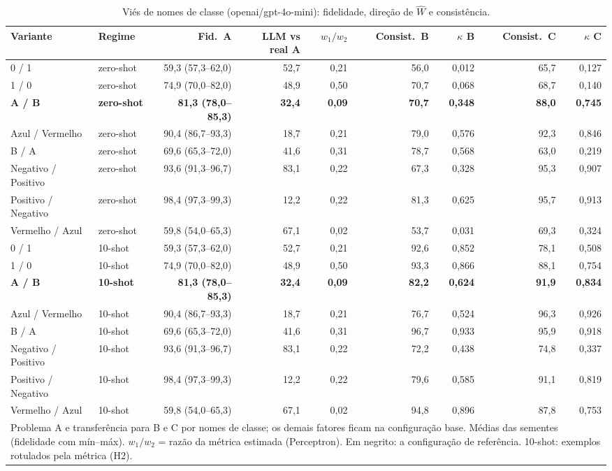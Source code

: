 \begin{table}[htbp]
\centering
\small
\caption{Viés de nomes de classe (openai/gpt-4o-mini): fidelidade, direção de $\hat{W}$ e consistência.}
\label{tab:bloco1_vies_nomes_classe_gpt4mini}
\begin{tabular}{llrrrrrrr}
\toprule
Variante & Regime & Fid.\ A & LLM vs real A & $w_1/w_2$ & Consist.\ B & $\kappa$ B & Consist.\ C & $\kappa$ C \\
\midrule
0 / 1 & zero-shot & 59,3 (57,3–62,0) & 52,7 & 0,21 & 56,0 & 0,012 & 65,7 & 0,127 \\
1 / 0 & zero-shot & 74,9 (70,0–82,0) & 48,9 & 0,50 & 70,7 & 0,068 & 68,7 & 0,140 \\
\textbf{A / B} & \textbf{zero-shot} & \textbf{81,3 (78,0–85,3)} & \textbf{32,4} & \textbf{0,09} & \textbf{70,7} & \textbf{0,348} & \textbf{88,0} & \textbf{0,745} \\
Azul / Vermelho & zero-shot & 90,4 (86,7–93,3) & 18,7 & 0,21 & 79,0 & 0,576 & 92,3 & 0,846 \\
B / A & zero-shot & 69,6 (65,3–72,0) & 41,6 & 0,31 & 78,7 & 0,568 & 63,0 & 0,219 \\
Negativo / Positivo & zero-shot & 93,6 (91,3–96,7) & 83,1 & 0,22 & 67,3 & 0,328 & 95,3 & 0,907 \\
Positivo / Negativo & zero-shot & 98,4 (97,3–99,3) & 12,2 & 0,22 & 81,3 & 0,625 & 95,7 & 0,913 \\
Vermelho / Azul & zero-shot & 59,8 (54,0–65,3) & 67,1 & 0,02 & 53,7 & 0,031 & 69,3 & 0,324 \\
\midrule
0 / 1 & 10-shot & 59,3 (57,3–62,0) & 52,7 & 0,21 & 92,6 & 0,852 & 78,1 & 0,508 \\
1 / 0 & 10-shot & 74,9 (70,0–82,0) & 48,9 & 0,50 & 93,3 & 0,866 & 88,1 & 0,754 \\
\textbf{A / B} & \textbf{10-shot} & \textbf{81,3 (78,0–85,3)} & \textbf{32,4} & \textbf{0,09} & \textbf{82,2} & \textbf{0,624} & \textbf{91,9} & \textbf{0,834} \\
Azul / Vermelho & 10-shot & 90,4 (86,7–93,3) & 18,7 & 0,21 & 76,7 & 0,524 & 96,3 & 0,926 \\
B / A & 10-shot & 69,6 (65,3–72,0) & 41,6 & 0,31 & 96,7 & 0,933 & 95,9 & 0,918 \\
Negativo / Positivo & 10-shot & 93,6 (91,3–96,7) & 83,1 & 0,22 & 72,2 & 0,438 & 74,8 & 0,337 \\
Positivo / Negativo & 10-shot & 98,4 (97,3–99,3) & 12,2 & 0,22 & 79,6 & 0,585 & 91,1 & 0,819 \\
Vermelho / Azul & 10-shot & 59,8 (54,0–65,3) & 67,1 & 0,02 & 94,8 & 0,896 & 87,8 & 0,753 \\
\bottomrule
\multicolumn{9}{p{0.95\linewidth}}{\footnotesize Problema A e transferência para B e C por nomes de classe; os demais fatores ficam na configuração base. Médias das sementes (fidelidade com mín–máx). $w_1/w_2$ = razão da métrica estimada (Perceptron). Em negrito: a configuração de referência. 10-shot: exemplos rotulados pela métrica (H2).} \\
\end{tabular}
\end{table}
